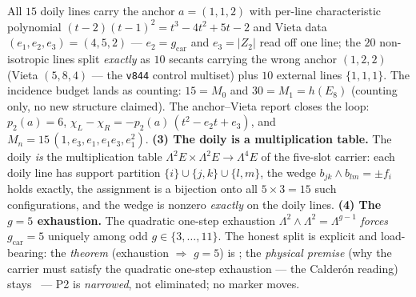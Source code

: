\documentclass[11pt,a4paper]{article}
\newcommand{\gcar}{g_{\mathrm{car}}}
\theoremstyle{definition}
\begin{document}
\begin{keybox}
\noindent All $15$ doily lines carry the anchor $a = (1,1,2)$
with per-line characteristic polynomial $(t-2)(t-1)^2 = t^3 -
4t^2 + 5t - 2$ and Vieta data $(e_1, e_2, e_3) = (4, 5, 2)$ ---
$e_2 = \gcar$ and $e_3 = |Z_2|$ read off one line; the $20$
non-isotropic lines split \emph{exactly} as $10$ secants carrying
the wrong anchor $(1,2,2)$ (Vieta $(5,8,4)$ --- the
\texttt{v844} control multiset) plus $10$ external lines
$\{1,1,1\}$.  The incidence budget lands as counting: $15 = M_0$
and $30 = M_1 = h(E_8)$ (counting only, no new structure
claimed).  The anchor--Vieta report closes the loop: $p_2(a) =
6$, $\chi_L - \chi_R = -p_2(a)\,(t^2 - e_2 t + e_3)$, and $M_n =
15\,(1, e_3, e_1, e_1 e_3, e_1^2)$.  \textbf{(3) The doily is a
multiplication table.}  The doily \emph{is} the multiplication
table $\Lambda^2 E \times \Lambda^2 E \to \Lambda^4 E$ of the
five-slot carrier: each doily line has support partition $\{i\}
\cup \{j,k\} \cup \{l,m\}$, the wedge $b_{jk} \wedge b_{lm} =
\pm f_i$ holds exactly, the assignment is a bijection onto all
$5\times3 = 15$ such configurations, and the wedge is nonzero
\emph{exactly} on the doily lines.  \textbf{(4) The $g = 5$
exhaustion.}  The quadratic one-step exhaustion $\Lambda^2 \wedge
\Lambda^2 = \Lambda^{g-1}$ \emph{forces} $\gcar = 5$ uniquely
among odd $g \in \{3, \dots, 11\}$.  The honest split is explicit
and load-bearing: the \emph{theorem} (exhaustion $\Rightarrow$
$g = 5$) is \mE; the \emph{physical premise} (why the carrier
must satisfy the quadratic one-step exhaustion --- the Calder\'on
reading) stays \mO\ --- P2 is \emph{narrowed}, not eliminated; no
marker moves.
\end{keybox}
\end{document}
